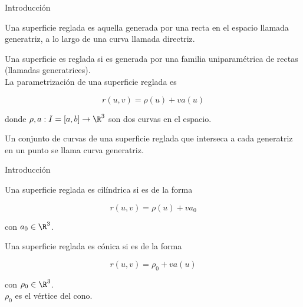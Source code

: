 \documentclass[10pt]{beamer}
\begin{document}
	\begin{frame}{Introducción}
		\begin{defi}
			Una superficie reglada es aquella generada por una recta en el espacio llamada generatriz, a lo largo de una curva llamada directriz.
		\end{defi}	
		
		\begin{defi}
			Una superficie es reglada si es generada por una familia uniparamétrica de rectas (llamadas generatrices).\\
			
			La parametrización de una superficie reglada es 
			
			\begin{equation}
			r(u,v) = \rho(u) + v a(u)
			\end{equation}
			
			donde $\rho, a : I = [a,b] \to \R^3$ son dos curvas en el espacio.
		\end{defi}
		
		\begin{defi}
			Un conjunto de curvas de una superficie reglada que interseca a cada generatriz en un punto se llama curva generatriz.
		\end{defi}	
		
	\end{frame}
	
	\begin{frame}{Introducción}
		\begin{defi}
			Una superficie reglada es cilíndrica si es de la forma 
			
			\begin{equation}
			r(u,v) = \rho(u) + v a_0
			\end{equation}
			
			con $a_0 \in \R^3$.
		\end{defi}
		
		\begin{defi}
			Una superficie reglada es cónica si es de la forma 
			
			\begin{equation}
			r(u,v) = \rho_0 + v a(u)
			\end{equation}
			
			con $\rho_0 \in \R^3$.\\
			
			$\rho_0$ es el vértice del cono.
		\end{defi}
	\end{frame}
	
\end{document}
